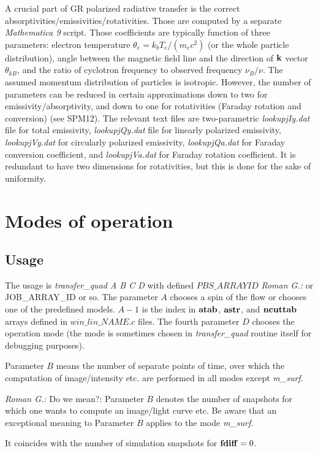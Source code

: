 \documentclass{emulateapj}
\newcommand{\mat}{\textit{Mathematica 9 }}
\newcommand{\rg}[1]{\color{blue}\textit{Roman G.:} #1\color{black}}
\begin{document}
A crucial part of GR polarized radiative transfer is the correct
absorptivities/emissivities/rotativities.  Those are computed by a
separate \mat script. Those coefficients are typically function of
three parameters: electron temperature $\theta_e=k_b T_e/(m_e c^2)$
(or the whole particle distribution), angle between the magnetic field
line and the direction of ${\bf k}$ vector $\theta_{kB}$, and the
ratio of cyclotron frequency to observed frequency $\nu_B/\nu$. The
assumed momentum distribution of particles is isotropic.  However, the
number of parameters can be reduced in certain approximations down to
two for emissivity/absorptivity, and down to one for rotativities
(Faraday rotation and conversion) (see SPM12). The relevant text files
are two-parametric \textit{lookupjIy.dat} file for total emissivity,
\textit{lookupjQy.dat} file for linearly polarized emissivity,
\textit{lookupjVy.dat} for circularly polarized emissivity,
\textit{lookupjQa.dat} for Faraday conversion coefficient, and
\textit{lookupjVa.dat} for Faraday rotation coefficient. It is
redundant to have two dimensions for rotativities, but this is done
for the sake of uniformity.

\section{Modes of operation}
\subsection{Usage}
The usage is \textit{transfer\_quad A B C D} with defined
$PBS\_ARRAYID$ \rg{or JOB\_ARRAY\_ID or so}.  The parameter $A$ chooses
a spin of the flow or chooses one of the predefined models. $A-1$ is
the index in ${\bf atab}$, ${\bf astr}$, and ${\bf ncuttab}$ arrays
defined in $\textit{win\_lin\_NAME.c}$ files. The fourth parameter $D$
chooses the operation mode (the mode is sometimes chosen in
\textit{transfer\_quad} routine itself for debugging purposes).

Parameter $B$ means the number of separate points of time, over which
the computation of image/intensity etc. are performed in all modes
except \textit{m\_surf}.  

\rg{Do we mean?: Parameter $B$ denotes the number of snapshots for
  which one wants to compute an image/light curve etc. Be aware that
  an exceptional meaning to Parameter $B$ applies to the mode
  \textit{m\_surf}. }

It coincides with the number of simulation snapshots for ${\bf
  fdiff}=0$. 
\end{document}
